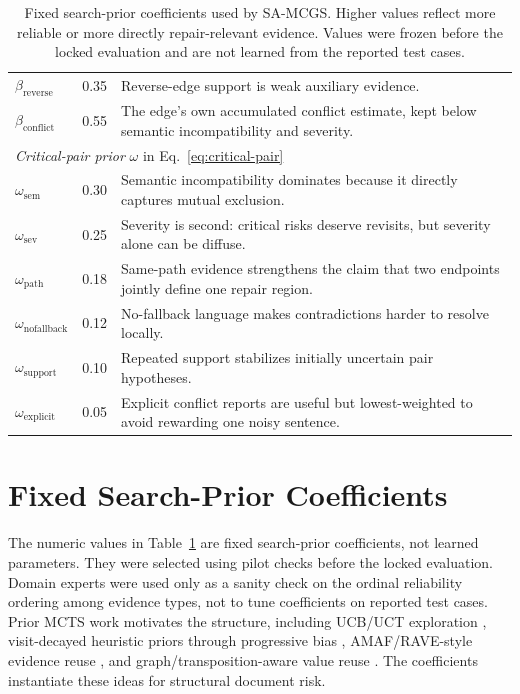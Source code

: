 \documentclass[11pt]{article}
\newcommand{\samcgs}{SA-MCGS}
\begin{document}
\begin{table}[t]
\begin{tabular}{p{}p{}p{}}
$\beta_{\mathrm{reverse}}$ & 0.35 & Reverse-edge support is weak auxiliary evidence.\\
$\beta_{\mathrm{conflict}}$ & 0.55 & The edge's own accumulated conflict estimate, kept below semantic incompatibility and severity.\\
\midrule
\multicolumn{3}{l}{\textit{Critical-pair prior }$\omega$ in Eq.~\ref{eq:critical-pair}}\\
$\omega_{\mathrm{sem}}$ & 0.30 & Semantic incompatibility dominates because it directly captures mutual exclusion.\\
$\omega_{\mathrm{sev}}$ & 0.25 & Severity is second: critical risks deserve revisits, but severity alone can be diffuse.\\
$\omega_{\mathrm{path}}$ & 0.18 & Same-path evidence strengthens the claim that two endpoints jointly define one repair region.\\
$\omega_{\mathrm{nofallback}}$ & 0.12 & No-fallback language makes contradictions harder to resolve locally.\\
$\omega_{\mathrm{support}}$ & 0.10 & Repeated support stabilizes initially uncertain pair hypotheses.\\
$\omega_{\mathrm{explicit}}$ & 0.05 & Explicit conflict reports are useful but lowest-weighted to avoid rewarding one noisy sentence.\\
\bottomrule
\end{tabular}
\caption{Fixed search-prior coefficients used by \samcgs{}.  Higher values reflect more reliable or more directly repair-relevant evidence.  Values were frozen before the locked evaluation and are not learned from the reported test cases.}
\label{tab:prior_coefficients}
\end{table}

\section{Fixed Search-Prior Coefficients}
\label{app:priors}

The numeric values in Table~\ref{tab:prior_coefficients} are fixed search-prior coefficients, not learned parameters.  They were selected using pilot checks before the locked evaluation.  Domain experts were used only as a sanity check on the ordinal reliability ordering among evidence types, not to tune coefficients on reported test cases.  Prior MCTS work motivates the structure, including UCB/UCT exploration \citep{kocsis2006bandit}, visit-decayed heuristic priors through progressive bias \citep{chaslot2008progressive,browne2012survey}, AMAF/RAVE-style evidence reuse \citep{gelly2007combining}, and graph/transposition-aware value reuse \citep{childs2008transpositions,czech2021monte}.  The coefficients instantiate these ideas for structural document risk.
\end{document}
